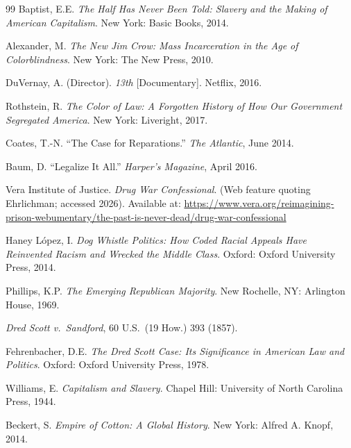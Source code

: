 \documentclass[12pt,openany]{book}
\begin{document}
\begin{thebibliography}{99}
Baptist, E.E. \textit{The Half Has Never Been Told: Slavery and the Making of American Capitalism}. New York: Basic Books, 2014.

Alexander, M. \textit{The New Jim Crow: Mass Incarceration in the Age of Colorblindness}. New York: The New Press, 2010.

DuVernay, A. (Director). \textit{13th} [Documentary]. Netflix, 2016.


Rothstein, R. \textit{The Color of Law: A Forgotten History of How Our Government Segregated America}. New York: Liveright, 2017.

Coates, T.-N. ``The Case for Reparations.'' \textit{The Atlantic}, June 2014.


Baum, D. ``Legalize It All.'' \textit{Harper's Magazine}, April 2016.

Vera Institute of Justice. \textit{Drug War Confessional}. (Web feature quoting Ehrlichman; accessed 2026). Available at: \url{https://www.vera.org/reimagining-prison-webumentary/the-past-is-never-dead/drug-war-confessional}

Haney L\'{o}pez, I. \textit{Dog Whistle Politics: How Coded Racial Appeals Have Reinvented Racism and Wrecked the Middle Class}. Oxford: Oxford University Press, 2014.

Phillips, K.P. \textit{The Emerging Republican Majority}. New Rochelle, NY: Arlington House, 1969.


\textit{Dred Scott v.\ Sandford}, 60 U.S.\ (19 How.) 393 (1857).

Fehrenbacher, D.E. \textit{The Dred Scott Case: Its Significance in American Law and Politics}. Oxford: Oxford University Press, 1978.


Williams, E. \textit{Capitalism and Slavery}. Chapel Hill: University of North Carolina Press, 1944.

Beckert, S. \textit{Empire of Cotton: A Global History}. New York: Alfred A. Knopf, 2014.


\end{thebibliography}
\end{document}
